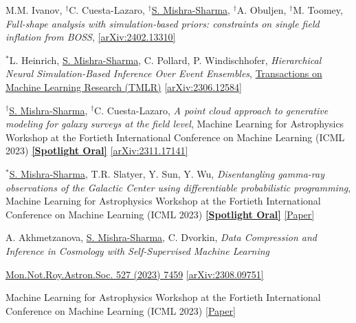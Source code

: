 \documentclass[letterpaper,11pt]{article}
\newenvironment{packed_itemize}{
\begin{itemize}[label=\raisebox{0.25ex}{\tiny$\bullet$}]
  \setlength{\itemsep}{4.2pt}
  \setlength{\parskip}{0pt}
  \setlength{\parsep}{0pt}}{\end{itemize}
}
\newenvironment{packed_enumerate}[1][]{
\begin{etaremune}[#1]
  \setlength{\itemsep}{3.7pt}
  \setlength{\parskip}{0pt}
  \setlength{\parsep}{0pt}}{\end{etaremune}
}
\begin{document}
\begin{packed_enumerate}[start=38]

  \item M.M. Ivanov, $^{\dagger}$C. Cuesta-Lazaro, $^{\dagger}$\underline{S. Mishra-Sharma}, $^{\dagger}$A. Obuljen, $^{\dagger}$M. Toomey, \emph{Full-shape analysis with simulation-based priors: constraints on single field inflation from BOSS}, \href{https://arxiv.org/abs/2402.13310}{[arXiv:2402.13310]}

  \item $^*$L. Heinrich, \underline{S. Mishra-Sharma}, C. Pollard, P. Windischhofer, \emph{Hierarchical Neural Simulation-Based Inference Over Event Ensembles}, \href{https://openreview.net/forum?id=Jy2IgzjoFH&referrer=%5BAuthor%20Console%5D(%2Fgroup%3Fid%3DTMLR%2FAuthors%23your-submissions)}{Transactions on Machine Learning Research (TMLR)} \href{https://arxiv.org/abs/2306.12584}{[arXiv:2306.12584]}

  \item $^{\dagger}$\underline{S. Mishra-Sharma}, $^{\dagger}$C. Cuesta-Lazaro, \emph{A point cloud approach to generative modeling for galaxy surveys at the field level}, {Machine Learning for Astrophysics Workshop at the Fortieth International Conference on Machine Learning (ICML 2023)} \href{https://ml4astro.github.io/icml2023/}{\textbf{[Spotlight Oral]}}  \href{https://arxiv.org/abs/2311.17141}{[arXiv:2311.17141]}  %

  \item $^*$\underline{S. Mishra-Sharma}, T.R. Slatyer, Y. Sun, Y. Wu, \emph{Disentangling gamma-ray observations of the Galactic Center using differentiable probabilistic programming}, {Machine Learning for Astrophysics Workshop at the Fortieth International Conference on Machine Learning (ICML 2023)} \href{https://ml4astro.github.io/icml2023/}{\textbf{[Spotlight Oral]}} \href{https://ml4astro.github.io/icml2023/assets/52.pdf}{[Paper]}

  \item A. Akhmetzanova, \underline{S. Mishra-Sharma}, C. Dvorkin, \emph{Data Compression and Inference in Cosmology with Self-Supervised Machine Learning}
  \begin{packed_itemize}
      \item \href{https://doi.org/10.1093/mnras/stad3646}{Mon.Not.Roy.Astron.Soc. 527 (2023) 7459} \href{https://arxiv.org/abs/2308.09751}{[arXiv:2308.09751]}
      \item {Machine Learning for Astrophysics Workshop at the Fortieth International Conference on Machine Learning (ICML 2023)} \href{https://ml4astro.github.io/icml2023/assets/11.pdf}{[Paper]} 
       \end{packed_itemize}
      

\end{packed_enumerate}
\end{document}
